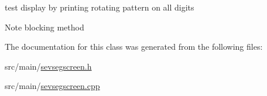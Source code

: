 test display by printing rotating pattern on all digits 

\begin{DoxyNote}{Note}
blocking method 
\end{DoxyNote}


The documentation for this class was generated from the following files\+:\begin{DoxyCompactItemize}
\item 
src/main/\hyperlink{sevsegscreen_8h}{sevsegscreen.\+h}\item 
src/main/\hyperlink{sevsegscreen_8cpp}{sevsegscreen.\+cpp}\end{DoxyCompactItemize}
